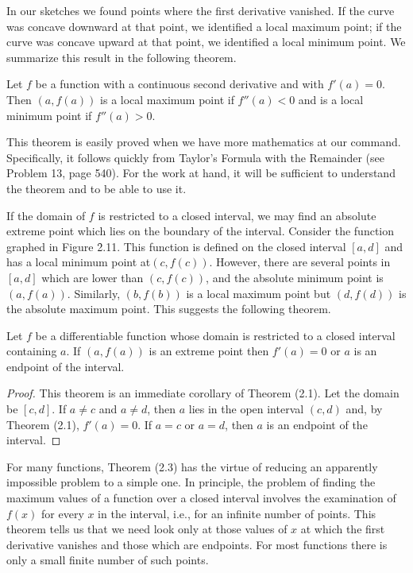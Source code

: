 In our sketches we found points where the first derivative vanished. If the curve was concave downward at that point, we identified a local maximum point; if the curve was concave upward at that point, we identified a local minimum point. We summarize this result in the following theorem.

\begin{prop} %
\label{thm 2.2.2}
Let $f$ be a function with a continuous second derivative and with $f'(a) = 0$. Then $(a, f(a))$ is a local maximum point if $f''(a) < 0$ and is a local minimum point if $f''(a) > 0$.
\end{prop}

This theorem is easily proved when we have more mathematics at our command. Specifically, it follows quickly from Taylor's Formula with the Remainder (see Problem 13, page 540). For the work at hand, it will be sufficient to understand the theorem and to be able to use it.

If the domain of $f$ is restricted to a closed interval, we may find an absolute extreme point which lies on the boundary of the interval. Consider the function graphed in Figure \f{2.11}. This function is defined on the closed interval $[a, d]$ and has a local minimum point at$(c, f(c))$. However, there are several points in $[a, d]$ which are lower than $(c,f(c))$, and the absolute minimum point is $(a, f(a))$. Similarly, $(b, f(b))$ is a local maximum point but $(d, f(d))$ is the absolute maximum point.  This suggests the following theorem.


\begin{prop} 
\label{thm 2.2.3}
Let $f$ be a differentiable function whose domain is restricted to a closed interval containing $a$.  If $(a, f(a))$ is an extreme point then $f'(a) = 0$ or $a$ is an endpoint of the interval.
\end{prop}

\begin{proof}
This theorem is an immediate corollary of Theorem (2.1). Let the domain be $[c, d]$. If $a \neq c$ and $a \neq d$, then $a$ lies in the open interval $(c, d)$ and, by Theorem (2.1), $f'(a) = 0$. If $a = c$ or $a = d$, then $a$ is an endpoint of the interval.
\end{proof}

For many functions, Theorem (2.3) has the virtue of reducing an apparently impossible problem to a simple one. In principle, the problem of finding the maximum values of a function over a closed interval involves the examination of $f(x)$ for every $x$ in the interval, i.e., for an infinite number of points. This theorem tells us that we need look only at those values of $x$ at which the first derivative vanishes and those which are endpoints. For most functions there is only a small finite number of such points.

